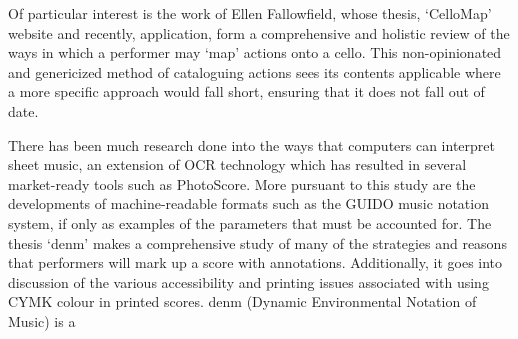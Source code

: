 Of particular interest is the work of Ellen Fallowfield, whose thesis, `CelloMap' website and recently, application, form a comprehensive and holistic review of the ways in which a performer may `map' actions onto a cello.\autocite[]{fallowfieldCelloMapHandbook2009,fallowfieldCelloMap}
This non-opinionated and genericized method of cataloguing actions sees its contents applicable where a more specific approach would fall short, ensuring that it does not fall out of date.

There has been much research done into the ways that computers can interpret sheet music, an extension of OCR technology which has resulted in several market-ready tools such as PhotoScore. 
More pursuant to this study are the developments of machine-readable formats such as the GUIDO music notation system, if only as examples of the parameters that must be accounted for.
The thesis `denm' makes a comprehensive study of many of the strategies and reasons that performers will mark up a score with annotations. 
Additionally, it goes into discussion of the various accessibility and printing issues associated with using CYMK colour in printed scores.\autocite[22--29]{beanDenmDynamicEnvironmental}
denm (Dynamic Environmental Notation of Music) is a 

